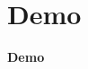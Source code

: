 \section{Demo}

\begin{frame}%
    \centering
    \vspace*{\fill}
    \Huge{\textbf{Demo}}
    \vspace*{\fill}
\end{frame}